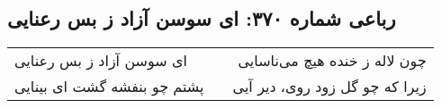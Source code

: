\begin{center}
\section*{رباعی شماره ۳۷۰: ای سوسن آزاد ز بس رعنایی}
\label{sec:sh370}
\begin{longtable}{l p{0.5cm} r}
ای سوسن آزاد ز بس رعنایی
&&
چون لاله ز خنده هیچ می‌ناسایی
\\
پشتم چو بنفشه گشت ای بینایی
&&
زیرا که چو گل زود روی، دیر آیی
\\
\end{longtable}
\end{center}
